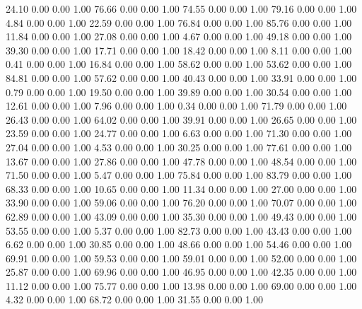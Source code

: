    24.10   0.00   0.00   1.00
   76.66   0.00   0.00   1.00
   74.55   0.00   0.00   1.00
   79.16   0.00   0.00   1.00
    4.84   0.00   0.00   1.00
   22.59   0.00   0.00   1.00
   76.84   0.00   0.00   1.00
   85.76   0.00   0.00   1.00
   11.84   0.00   0.00   1.00
   27.08   0.00   0.00   1.00
    4.67   0.00   0.00   1.00
   49.18   0.00   0.00   1.00
   39.30   0.00   0.00   1.00
   17.71   0.00   0.00   1.00
   18.42   0.00   0.00   1.00
    8.11   0.00   0.00   1.00
    0.41   0.00   0.00   1.00
   16.84   0.00   0.00   1.00
   58.62   0.00   0.00   1.00
   53.62   0.00   0.00   1.00
   84.81   0.00   0.00   1.00
   57.62   0.00   0.00   1.00
   40.43   0.00   0.00   1.00
   33.91   0.00   0.00   1.00
    0.79   0.00   0.00   1.00
   19.50   0.00   0.00   1.00
   39.89   0.00   0.00   1.00
   30.54   0.00   0.00   1.00
   12.61   0.00   0.00   1.00
    7.96   0.00   0.00   1.00
    0.34   0.00   0.00   1.00
   71.79   0.00   0.00   1.00
   26.43   0.00   0.00   1.00
   64.02   0.00   0.00   1.00
   39.91   0.00   0.00   1.00
   26.65   0.00   0.00   1.00
   23.59   0.00   0.00   1.00
   24.77   0.00   0.00   1.00
    6.63   0.00   0.00   1.00
   71.30   0.00   0.00   1.00
   27.04   0.00   0.00   1.00
    4.53   0.00   0.00   1.00
   30.25   0.00   0.00   1.00
   77.61   0.00   0.00   1.00
   13.67   0.00   0.00   1.00
   27.86   0.00   0.00   1.00
   47.78   0.00   0.00   1.00
   48.54   0.00   0.00   1.00
   71.50   0.00   0.00   1.00
    5.47   0.00   0.00   1.00
   75.84   0.00   0.00   1.00
   83.79   0.00   0.00   1.00
   68.33   0.00   0.00   1.00
   10.65   0.00   0.00   1.00
   11.34   0.00   0.00   1.00
   27.00   0.00   0.00   1.00
   33.90   0.00   0.00   1.00
   59.06   0.00   0.00   1.00
   76.20   0.00   0.00   1.00
   70.07   0.00   0.00   1.00
   62.89   0.00   0.00   1.00
   43.09   0.00   0.00   1.00
   35.30   0.00   0.00   1.00
   49.43   0.00   0.00   1.00
   53.55   0.00   0.00   1.00
    5.37   0.00   0.00   1.00
   82.73   0.00   0.00   1.00
   43.43   0.00   0.00   1.00
    6.62   0.00   0.00   1.00
   30.85   0.00   0.00   1.00
   48.66   0.00   0.00   1.00
   54.46   0.00   0.00   1.00
   69.91   0.00   0.00   1.00
   59.53   0.00   0.00   1.00
   59.01   0.00   0.00   1.00
   52.00   0.00   0.00   1.00
   25.87   0.00   0.00   1.00
   69.96   0.00   0.00   1.00
   46.95   0.00   0.00   1.00
   42.35   0.00   0.00   1.00
   11.12   0.00   0.00   1.00
   75.77   0.00   0.00   1.00
   13.98   0.00   0.00   1.00
   69.00   0.00   0.00   1.00
    4.32   0.00   0.00   1.00
   68.72   0.00   0.00   1.00
   31.55   0.00   0.00   1.00
